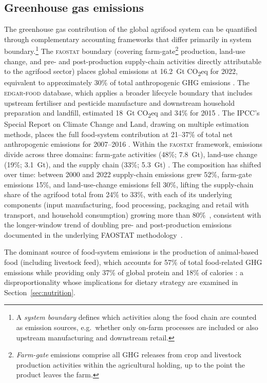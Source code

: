 \subsection{Greenhouse gas emissions}\label{sec:ghg}
The greenhouse gas contribution of the global agrifood system can be quantified
through complementary accounting frameworks that differ primarily in system
boundary.\footnote{A \emph{system boundary} defines which activities along the
food chain are counted as emission sources, e.g.\ whether only on-farm
processes are included or also upstream manufacturing and downstream retail.}
The \textsc{faostat} boundary (covering farm-gate\footnote{\emph{Farm-gate}
emissions comprise all GHG releases from crop and livestock production
activities within the agricultural holding, up to the point the product leaves
the farm.} production,
land-use change, and pre- and post-production supply-chain activities directly
attributable to the agrifood sector) places global emissions at 16.2~Gt
CO\textsubscript{2}eq for 2022, equivalent to approximately 30\% of total
anthropogenic GHG emissions \cite[p.~2, Highlights]{fao2024ghg}. The \textsc{edgar-food} database, which applies a broader lifecycle
boundary that includes upstream fertiliser and pesticide manufacture and
downstream household preparation and landfill, estimated 18~Gt
CO\textsubscript{2}eq and 34\% for 2015 \cite[p.~198, Fig.~1]{crippa2021foodghg}. The IPCC's Special Report on
Climate Change and Land, drawing on multiple estimation methods, places the full
food-system contribution at 21--37\% of total net anthropogenic emissions
for 2007--2016 \cite[SPM~A.3]{ipcc2019srccl}. Within the \textsc{faostat} framework,
emissions divide across three domains: farm-gate activities (48\%; 7.8~Gt),
land-use change (19\%; 3.1~Gt), and the supply chain (33\%; 5.3~Gt)
\cite[p.~2, Highlights]{fao2024ghg}. The composition has shifted over time: between 2000 and 2022 supply-chain emissions grew 52\%, farm-gate emissions 15\%, and land-use-change emissions fell 30\%, lifting the supply-chain share of the agrifood total from 24\% to 33\%, with each of its underlying components (input manufacturing, food processing, packaging and retail with transport, and household consumption) growing more than 80\%~\cite[p.~3--4]{fao2024ghg}, consistent with the longer-window trend of doubling pre- and post-production emissions documented in the underlying FAOSTAT methodology~\cite[Abstract; p.~1799]{tubiello2022supply}.

The dominant source of food-system emissions is the production of animal-based
food (including livestock feed), which accounts for 57\% of total
food-related GHG emissions \cite[p.~724]{xu2021animalbased} while providing only
37\% of global protein and 18\% of calories \cite[p.~990]{poore2018reducing}: a
disproportionality whose implications for dietary strategy are examined in
Section~\ref{sec:nutrition}.

